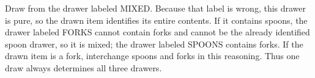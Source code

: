 Draw from the drawer labeled MIXED. Because that label is wrong, this drawer is pure, so the drawn item identifies its entire contents. If it contains spoons, the drawer labeled FORKS cannot contain forks and cannot be the already identified spoon drawer, so it is mixed; the drawer labeled SPOONS contains forks. If the drawn item is a fork, interchange spoons and forks in this reasoning. Thus one draw always determines all three drawers.
